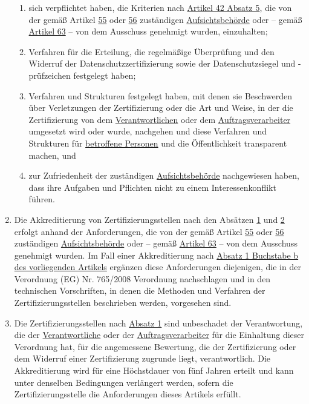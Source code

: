 \begin{enumerate}
\begin{enumerate}
    \item sich verpflichtet haben, die Kriterien nach \hyperref[itm:42-5]{Artikel 42 Absatz 5}, die von der gemäß
     Artikel \hyperref[ch:55]{55} oder \hyperref[ch:56]{56} zuständigen \hyperref[itm:04-21]{Aufsichtsbehörde} oder --
     gemäß \hyperref[ch:63]{Artikel 63} -- von dem Ausschuss genehmigt wurden, einzuhalten;%
    \label{itm:43-2b}

    \item Verfahren für die Erteilung, die regelmäßige Überprüfung und den Widerruf der Datenschutzzertifizierung sowie
     der Datenschutzsiegel und -prüfzeichen festgelegt haben;%
    \label{itm:43-2c}

    \item Verfahren und Strukturen festgelegt haben, mit denen sie Beschwerden über Verletzungen der Zertifizierung oder
     die Art und Weise, in der die Zertifizierung von dem \hyperref[itm:04-7]{Verantwortlichen} oder dem \hyperref
     [itm:04-8]{Auftragsverarbeiter} umgesetzt wird oder wurde, nachgehen und diese Verfahren und Strukturen
     für \hyperref[itm:04-1]{betroffene Personen} und die Öffentlichkeit transparent machen, und%
    \label{itm:43-2d}

    \item zur Zufriedenheit der zuständigen \hyperref[itm:04-21]{Aufsichtsbehörde} nachgewiesen haben, dass ihre
     Aufgaben und Pflichten nicht zu einem Interessenkonflikt führen.%
    \label{itm:43-2e}

  \end{enumerate}

  \item Die Akkreditierung von Zertifizierungsstellen nach den Absätzen \hyperref[itm:43-1]{1} und \hyperref[itm:43-2]
   {2} erfolgt anhand der Anforderungen, die von der gemäß Artikel \hyperref[ch:55]{55} oder \hyperref[ch:56]
   {56} zuständigen \hyperref[itm:04-21]{Aufsichtsbehörde} oder -- gemäß \hyperref[ch:63]{Artikel 63} -- von dem
   Ausschuss genehmigt wurden. Im Fall einer Akkreditierung nach \hyperref[itm:43-1b]{Absatz 1 Buchstabe b des
   vorliegenden Artikels} ergänzen diese Anforderungen diejenigen, die in der Verordnung (EG) Nr. 765/2008\todo
   {Verordnung nachschlagen} und in den technischen Vorschriften, in denen die Methoden und Verfahren der
   Zertifizierungsstellen beschrieben werden, vorgesehen sind.%
  \label{itm:43-3}

  \item Die Zertifizierungsstellen nach \hyperref[itm:43-1]{Absatz 1} sind unbeschadet der Verantwortung, die der
   \hyperref[itm:04-7]{Verantwortliche} oder der \hyperref[itm:04-8]{Auftragsverarbeiter} für die Einhaltung dieser
    Verordnung hat, für die angemessene Bewertung, die der Zertifizierung oder dem Widerruf einer Zertifizierung
    zugrunde liegt, verantwortlich. Die Akkreditierung wird für eine Höchstdauer von fünf Jahren erteilt und kann unter
    denselben Bedingungen verlängert werden, sofern die Zertifizierungsstelle die Anforderungen dieses Artikels
    erfüllt.%
  \label{itm:43-4}


\end{enumerate}
